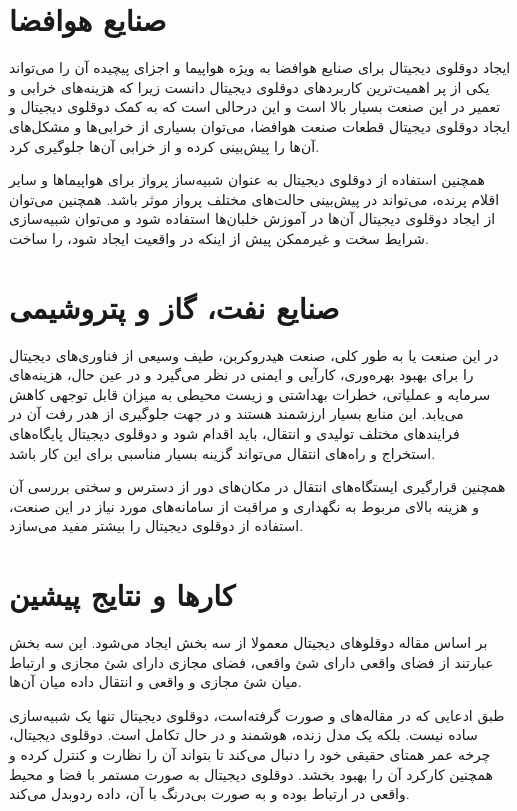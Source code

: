 \section{صنایع هوافضا}
ایجاد دوقلوی دیجیتال برای صنایع هوافضا به ویژه هواپیما و اجزای پیچیده آن را می‌تواند یکی از پر اهمیت‌ترین کاربرد‌های دوقلوی دیجیتال دانست زیرا که هزینه‌های خرابی و تعمیر در این صنعت بسیار بالا است و این درحالی است که به کمک دوقلوی دیجیتال و ایجاد دوقلوی دیجیتال قطعات صنعت هوافضا، می‌توان بسیاری از خرابی‌ها و مشکل‌های آن‌ها را پیش‌بینی کرده و از خرابی آن‌ها جلوگیری کرد.

همچنین استفاده از دوقلوی دیجیتال به عنوان شبیه‌ساز پرواز برای هواپیما‌ها و سایر اقلام پرنده، می‌تواند در پیش‌بینی حالت‌های مختلف پرواز موثر باشد. همچنین می‌توان از ایجاد دوقلوی دیجیتال آن‌ها در آموزش خلبان‌ها استفاده شود و می‌توان شبیه‌سازی شرایط سخت و غیرممکن پیش از اینکه در واقعیت ایجاد شود، را ساخت.

\section{صنایع نفت، گاز و پتروشیمی}
در این صنعت یا به طور کلی، صنعت هیدروکربن، طیف وسیعی از فناوری‌های دیجیتال را برای بهبود بهره‌وری، کارآیی و ایمنی در نظر می‌گیرد و در عین حال، هزینه‌های سرمایه و عملیاتی، خطرات بهداشتی و زیست محیطی به میزان قابل توجهی کاهش می‌یابد. این منابع بسیار ارزشمند هستند و در جهت جلوگیری از هدر رفت آن در فرایند‌های مختلف تولیدی و انتقال،‌ باید اقدام شود و دوقلوی دیجیتال پایگاه‌های استخراج و راه‌‌های انتقال می‌تواند گزینه بسیار مناسبی برای این کار باشد.

همچنین قرارگیری ایستگاه‌های انتقال در مکان‌های دور از دسترس و سختی بررسی آن و هزینه بالای مربوط به نگهداری و مراقبت از سامانه‌های مورد نیاز در این صنعت، استفاده از دوقلوی دیجیتال را بیشتر مفید می‌سازد.

\section{کار‌ها و نتایج پیشین}


بر اساس مقاله 
\cite{b7}
دوقلو‌های دیجیتال معمولا از سه بخش ایجاد می‌شود. این سه بخش عبارتند از فضای واقعی دارای شئ واقعی، فضای مجازی دارای شئ مجازی و ارتباط میان شئ مجازی و واقعی و انتقال داده ‌میان آن‌ها.

طبق ادعایی که در مقاله‌های 
\cite{b8}
و
\cite{b9}
صورت گرفته‌است، دوقلو‌ی دیجیتال تنها یک شبیه‌سازی ساده نیست. بلکه یک مدل زنده، هوشمند و در حال تکامل است. دوقلوی دیجیتال، چرخه عمر همتای حقیقی خود را دنبال می‌کند تا بتواند آن را نظارت
و کنترل
کرده و همچنین کارکرد آن را بهبود بخشد. دوقلوی دیجیتال به صورت مستمر با فضا و محیط واقعی در ارتباط بوده و به صورت بی‌درنگ با آن، داده‌ ردوبدل می‌کند.


